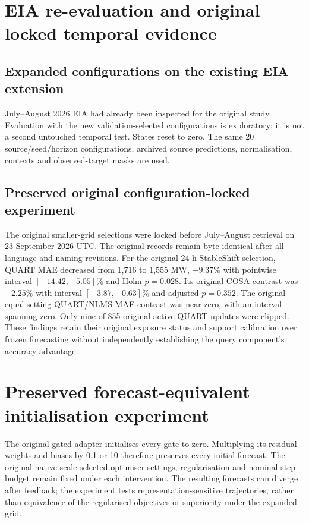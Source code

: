 \documentclass[11pt,a4paper]{article}
\begin{document}
\section{EIA re-evaluation and original locked temporal evidence}
\subsection{Expanded configurations on the existing EIA extension}
July--August 2026 EIA had already been inspected for the original study. Evaluation with the new validation-selected configurations is exploratory; it is not a second untouched temporal test. States reset to zero. The same 20 source/seed/horizon configurations, archived source predictions, normalisation, contexts and observed-target masks are used.
{\footnotesize}
{\footnotesize}
{\footnotesize}

\subsection{Preserved original configuration-locked experiment}
The original smaller-grid selections were locked before July--August retrieval on 23 September 2026 UTC. The original records remain byte-identical after all language and naming revisions. For the original 24 h StableShift selection, QUART MAE decreased from 1,716 to 1,555 MW, $-9.37\%$ with pointwise interval $[-14.42,-5.05]\%$ and Holm $p=0.028$. Its original COSA contrast was $-2.25\%$ with interval $[-3.87,-0.63]\%$ and adjusted $p=0.352$. The original equal-setting QUART/NLMS MAE contrast was near zero, with an interval spanning zero. Only nine of 855 original active QUART updates were clipped. These findings retain their original exposure status and support calibration over frozen forecasting without independently establishing the query component's accuracy advantage.
{\footnotesize}

\section{Preserved forecast-equivalent initialisation experiment}
The original gated adapter initialises every gate to zero. Multiplying its residual weights and biases by 0.1 or 10 therefore preserves every initial forecast. The original native-scale selected optimiser settings, regularisation and nominal step budget remain fixed under each intervention. The resulting forecasts can diverge after feedback; the experiment tests representation-sensitive trajectories, rather than equivalence of the regularised objectives or superiority under the expanded grid.
{\footnotesize}
{\footnotesize}
\end{document}
